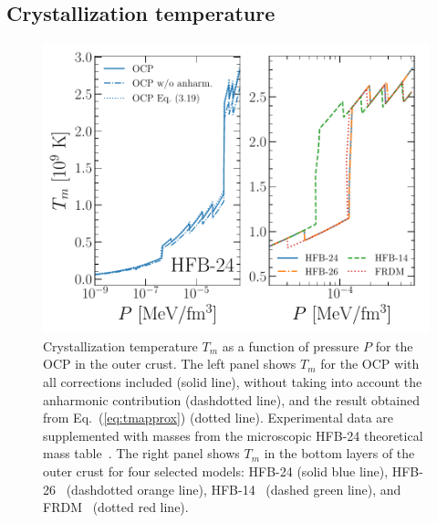 \subsection{Crystallization temperature}\label{subsec:tm_ocrust}

\begin{figure}[!t]
  \begin{center}
    \includegraphics[width=0.9\linewidth]{figures/tm_ocrust.pdf}
  \end{center}
  \caption[Crystallization temperature versus pressure for the one-component 
  plasma in the outer crust]{Crystallization temperature $T_m$ as a function of
    pressure $P$ for the OCP in the outer crust. The left panel shows $T_m$ 
    for the  OCP with all corrections included (solid line), without 
    taking into account the anharmonic contribution (dashdotted line), and 
    the result obtained from Eq.~(\ref{eq:tmapprox}) (dotted line). 
    Experimental data are supplemented with masses from the microscopic HFB-24 
    theoretical mass table~\cite{Goriely2013}. 
    The right panel shows $T_m$ in the bottom layers of the outer crust for 
    four selected models: HFB-24 (solid blue line), HFB-26~\cite{Goriely2013}
    (dashdotted orange line), HFB-14~\cite{Goriely2007} (dashed green line), 
  and FRDM~\cite{Moller1995} (dotted red line).}\label{fig:tm_ocrust}
\end{figure}

